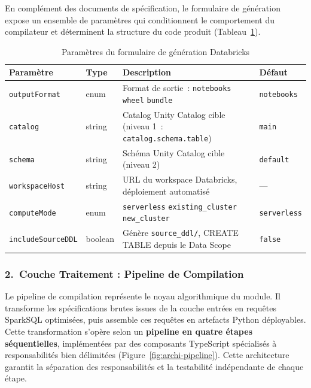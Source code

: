 En complément des documents de spécification, le formulaire de génération expose un ensemble de paramètres qui conditionnent le comportement du compilateur et déterminent la structure du code produit (Tableau~\ref{tab:options-generation}).

\begin{table}[H]
\centering
\caption{Paramètres du formulaire de génération Databricks}
\label{tab:options-generation}
\begin{tabularx}{\textwidth}{llXl}
\toprule
\textbf{Paramètre} & \textbf{Type} & \textbf{Description} & \textbf{Défaut} \\
\midrule
\texttt{outputFormat} & enum &
  Format de sortie~: \texttt{notebooks} \textbar{} \texttt{wheel} \textbar{} \texttt{bundle} & \texttt{notebooks} \\
\addlinespace
\texttt{catalog} & string &
  Catalog Unity Catalog cible (niveau 1~: \texttt{catalog.schema.table}) & \texttt{main} \\
\addlinespace
\texttt{schema} & string &
  Schéma Unity Catalog cible (niveau 2) & \texttt{default} \\
\addlinespace
\texttt{workspaceHost} & string &
  URL du workspace Databricks, déploiement automatisé & --- \\
\addlinespace
\texttt{computeMode} & enum &
  \texttt{serverless} \textbar{} \texttt{existing\_cluster} \textbar{} \texttt{new\_cluster} & \texttt{serverless} \\
\addlinespace
\texttt{includeSourceDDL} & boolean &
  Génère \texttt{source\_ddl/}, CREATE TABLE depuis le Data Scope & \texttt{false} \\
\bottomrule
\end{tabularx}
\end{table}

\subsubsection*{2.\ Couche Traitement : Pipeline de Compilation}

Le pipeline de compilation représente le noyau algorithmique du module. Il transforme les spécifications brutes issues de la couche entrées en requêtes SparkSQL optimisées, puis assemble ces requêtes en artefacts Python déployables. Cette transformation s'opère selon un \textbf{pipeline en quatre étapes séquentielles}, implémentées par des composants TypeScript spécialisés à responsabilités bien délimitées (Figure~\ref{fig:archi-pipeline}). Cette architecture garantit la séparation des responsabilités et la testabilité indépendante de chaque étape.

